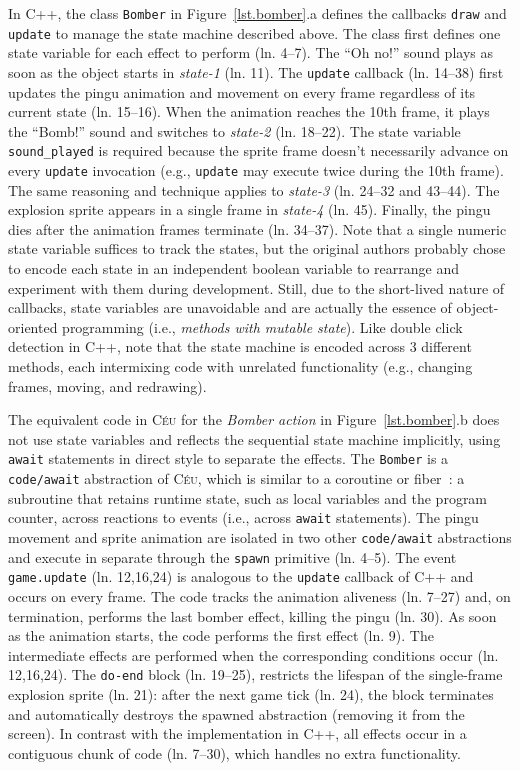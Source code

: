 \documentclass{vgtc}                          %
\newcommand{\CEU}{\textsc{C\'{e}u}\xspace}
\newcommand{\code}[1] {{\small{\texttt{#1}}}}
\begin{document}
In C++, the class \code{Bomber} in Figure~\ref{lst.bomber}.a defines the
callbacks \code{draw} and \code{update} to manage the state machine described
above.
%
The class first defines one state variable for each effect to perform
(ln. 4--7).
The ``Oh no!'' sound plays as soon as the object starts in \emph{state-1} 
(ln. 11).
The \code{update} callback (ln. 14--38) first updates the pingu animation and
movement on every frame regardless of its current state (ln. 15--16).
When the animation reaches the 10th frame, it plays the ``Bomb!'' sound and 
switches to \emph{state-2} (ln. 18--22).
The state variable \code{sound\_played} is required because the sprite frame
doesn't necessarily advance on every \code{update} invocation (e.g.,
\code{update} may execute twice during the 10th frame).
The same reasoning and technique applies to \emph{state-3} (ln. 24--32 and
43--44).
The explosion sprite appears in a single frame in \emph{state-4} (ln. 45).
Finally, the pingu dies after the animation frames terminate (ln. 34--37).
%
Note that a single numeric state variable suffices to track the states, but the
original authors probably chose to encode each state in an independent boolean 
variable to rearrange and experiment with them during development.
Still, due to the short-lived nature of callbacks, state variables are 
unavoidable and are actually the essence of object-oriented programming
(i.e., \emph{methods with mutable state}).
%
Like double click detection in C++, note that the state machine is encoded
across 3 different methods, each intermixing code with unrelated functionality
(e.g., changing frames, moving, and redrawing).

The equivalent code in \CEU for the \emph{Bomber action} in
Figure~\ref{lst.bomber}.b does not use state variables and reflects the
sequential state machine implicitly, using \code{await} statements in direct
style to separate the effects.
%
The \code{Bomber} is a \code{code/await} abstraction of \CEU, which is similar
to a coroutine or fiber~\cite{sync_async.cooperative}: a subroutine that
retains runtime state, such as local variables and the program counter, across
reactions to events (i.e., across \code{await} statements).
The pingu movement and sprite animation are isolated in two other
\code{code/await} abstractions and execute in separate through the \code{spawn}
primitive (ln. 4--5).
The event \code{game.update} (ln. 12,16,24) is analogous to the \code{update}
callback of C++ and occurs on every frame.
%
The code tracks the animation aliveness (ln. 7--27) and, on termination,
performs the last bomber effect, killing the pingu (ln. 30).
As soon as the animation starts, the code performs the first effect (ln. 9).
The intermediate effects are performed when the corresponding conditions occur
(ln. 12,16,24).
The \code{do-end} block (ln. 19--25), restricts the lifespan of the
single-frame explosion sprite (ln. 21): after the next game tick (ln. 24), the
block terminates and automatically destroys the spawned abstraction (removing
it from the screen).
%
In contrast with the implementation in C++, all effects occur in a contiguous
chunk of code (ln. 7--30), which handles no extra functionality.
\end{document}
